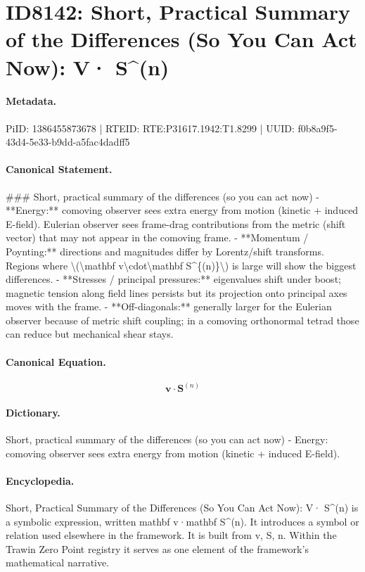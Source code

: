 \section*{ID8142: Short, Practical Summary of the Differences (So You Can Act Now): V· S\textasciicircum{}(n)}
\paragraph{Metadata.}
PiID: 1386455873678 | RTEID: RTE:P31617.1942:T1.8299 | UUID: f0b8a9f5-43d4-5e33-b9dd-a5fac4dadff5

\paragraph{Canonical Statement.}
\#\#\# Short, practical summary of the differences (so you can act now) - **Energy:** comoving observer sees extra energy from motion (kinetic + induced E-field). Eulerian observer sees frame-drag contributions from the metric (shift vector) that may not appear in the comoving frame. - **Momentum / Poynting:** directions and magnitudes differ by Lorentz/shift transforms. Regions where \textbackslash{}(\textbackslash{}mathbf v\textbackslash{}cdot\textbackslash{}mathbf S\textasciicircum{}\{(n)\}\textbackslash{}) is large will show the biggest differences. - **Stresses / principal pressures:** eigenvalues shift under boost; magnetic tension along field lines persists but its projection onto principal axes moves with the frame. - **Off-diagonals:** generally larger for the Eulerian observer because of metric shift coupling; in a comoving orthonormal tetrad those can reduce but mechanical shear stays.

\paragraph{Canonical Equation.}
\[
\mathbf v\cdot\mathbf S^{(n)}
\]

\paragraph{Dictionary.}
Short, practical summary of the differences (so you can act now) - Energy: comoving observer sees extra energy from motion (kinetic + induced E-field).

\paragraph{Encyclopedia.}
Short, Practical Summary of the Differences (So You Can Act Now): V· S\textasciicircum{}(n) is a symbolic expression, written mathbf v·mathbf S\textasciicircum{}(n). It introduces a symbol or relation used elsewhere in the framework. It is built from v, S, n. Within the Trawin Zero Point registry it serves as one element of the framework's mathematical narrative.
